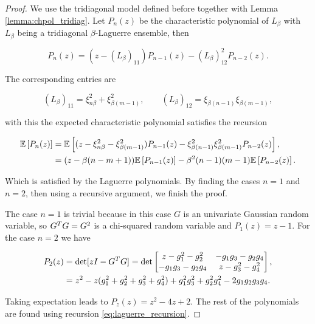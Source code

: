 \begin{proof}
    We use the tridiagonal model defined before together with Lemma \ref{lemma:chpol_tridiag}. Let $P_n(z)$ be the characteristic polynomial of $L_\beta$ with $L_\beta$ being a tridiagonal $\beta$-Laguerre ensemble, then

    \begin{equation*}
        P_n(z) = (z - (L_\beta)_{11})P_{n-1}(z) - (L_\beta)_{12}^2 P_{n-2}(z).
    \end{equation*}

    The corresponding entries are

    \begin{equation*}
        (L_\beta)_{11} = \xi^2_{n\beta} + \xi^2_{\beta(m-1)}, \qquad (L_\beta)_{12} = \xi_{\beta(n-1)}\xi_{\beta(m-1)},
    \end{equation*}

    \noindent with this the expected characteristic polynomial satisfies the recursion

    \begin{align} \label{eq:laguerre_recursion}
        \mathbb E \left[ P_n(z) \right] &= \mathbb E \left[  (z - \xi^2_{n\beta} - \xi^2_{\beta(m-1)})P_{n-1}(z) - \xi^2_{\beta(n-1)}\xi_{\beta(m-1)}^2 P_{n-2}(z)  \right],\\ 
        &= (z - \beta(n - m + 1))\mathbb E \left[ P_{n-1}(z) \right] - \beta^2(n-1)(m-1)\mathbb E \left[ P_{n-2}(z) \right].
    \end{align}

    Which is satisfied by the Laguerre polynomials. By finding the cases $n=1$ and $n=2$, then using a recursive argument, we finish the proof.

    The case $n=1$ is trivial because in this case $G$ is an univariate Gaussian random variable, so $G^TG = G^2$ is a chi-squared random variable and $P_1(z) = z - 1$. For the case $n=2$ we have

    \begin{align*}
        P_2(z) &= \det[zI - G^TG] = \det\begin{bmatrix}
            z- g_1^2 - g_2^2 & -g_1g_3 - g_2 g_4 \\
            - g_1g_3 - g_2 g_4 & z - g_3^2 - g_4^2
        \end{bmatrix}, \\
        &= z^2 - z(g_1^2 + g_2^2 + g_3^2 + g_4^2) +g_1^2 g_3^2 + g_2^2g_4^2 -2g_1g_2g_3g_4.
    \end{align*}

    Taking expectation leads to $P_z(z) = z^2 - 4z + 2$. The rest of the polynomials are found using recursion \eqref{eq:laguerre_recursion}.
\end{proof}

